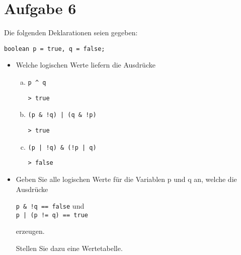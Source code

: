 \documentclass[10pt, oneside]{article}
\begin{document}
\section{Aufgabe 6}

Die folgenden Deklarationen seien gegeben:

\begin{verbatim}
boolean p = true, q = false;
\end{verbatim}

\begin{itemize}
    \item Welche logischen Werte liefern die Ausdrücke

    \begin{enumerate}[(a)]
        \item \verb+p ^ q+

            \verb+> true+
        \item \verb+(p & !q) | (q & !p)+

            \verb+> true+
        \item \verb+(p | !q) & (!p | q)+

            \verb+> false+
    \end{enumerate}

    \item Geben Sie alle logischen Werte für die Variablen p und q an, welche die Ausdrücke

    \verb+p & !q == false+ und \\
    \verb+p | (p != q) == true+

    erzeugen.

    Stellen Sie dazu eine Wertetabelle.


\end{itemize}
\end{document}
